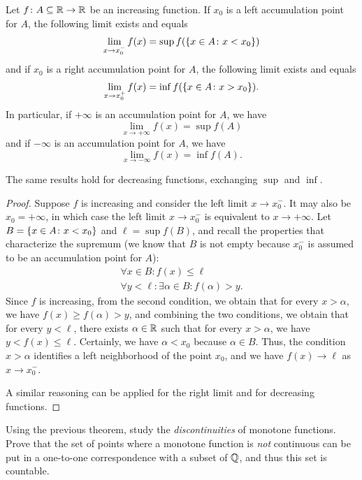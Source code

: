 \begin{theorem}%
  \mymark{**}%
  \label{th:limite_funzione_monotona}%
Let $f\colon A \subseteq {\mathbb R} \to {\mathbb R}$ be an increasing function. 
If $x_0$ is a left accumulation point for $A$, 
the following limit exists and equals
\[
   \lim_{x\to x_0^-}f(x) = \sup f({\left\{ x\in A\colon x<x_0 \right\}})
\]
and if $x_0$ is a right accumulation point for $A$, 
the following limit exists and equals
\[
   \lim_{x\to x_0^+} f(x) = \inf f({\left\{ x\in A\colon x>x_0 \right\}}).
\]
In particular, if $+\infty$ is an accumulation point for $A$, 
we have 
\[
  \lim_{x\to +\infty} f(x) = \sup f(A)
\]
and if $-\infty$ is an accumulation point for $A$, we have 
\[
  \lim_{x\to -\infty} f(x) = \inf f(A).
\]

The same results hold for decreasing functions, 
exchanging $\sup$ and $\inf$.
\end{theorem}
%
\begin{proof}\mymark{**}
Suppose $f$ is increasing and consider the left limit $x\to x_0^-$. It may also
be $x_0=+\infty$, in which case the left limit $x\to x_0^-$ is equivalent to
$x\to +\infty$.
Let $B={\left\{ x\in A\colon x<x_0 \right\}}$
and $\ell=\sup f(B)$, and recall the properties that characterize 
the supremum
(we know that $B$ is not empty because $x_0^-$ is assumed 
to be an accumulation point for $A$):
\begin{gather*}
  \forall x \in B \colon f(x) \le \ell \\
  \forall y < \ell \colon \exists \alpha \in B \colon f(\alpha) > y.
\end{gather*}
Since $f$ is increasing, from the second condition, 
we obtain that for every $x>\alpha$, we have $f(x)\ge f(\alpha)> y$,
and combining the two conditions, we obtain that for every $y<\ell$,
there exists $\alpha\in{\mathbb R}$ such that for every $x>\alpha$, we have $y<f(x)\le
\ell$.
Certainly, we have $\alpha < x_0$ because $\alpha\in B$.   
Thus, the condition $x>\alpha$ identifies a left neighborhood 
of the point $x_0$, and we have $f(x)\to \ell$ as $x\to x_0^-$.

A similar reasoning can be applied for the right limit  
and for decreasing functions.
\end{proof}

\begin{exercise}
  Using the previous theorem, study the \emph{discontinuities}
  of monotone functions. 
  Prove that the set of points where a monotone function 
  is \emph{not} continuous can be put in a one-to-one correspondence 
  with a subset of ${\mathbb Q}$, and thus this set is countable.
\end{exercise}

